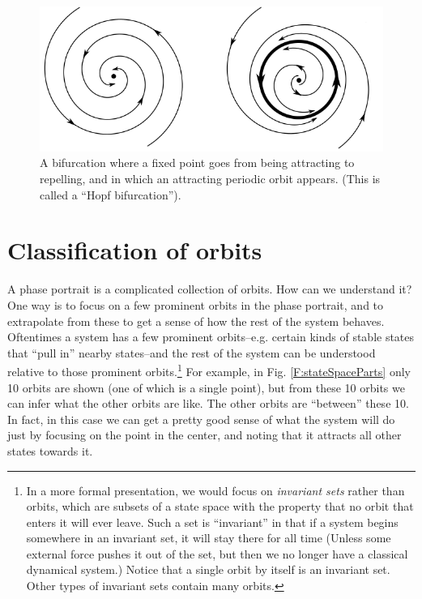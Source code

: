 \begin{figure}[h]
\centering
\includegraphics[scale=.5]{./images/bifurcation.png}
\caption[Scott Hotton.]{A bifurcation where a fixed point goes from being attracting to repelling, and in which an attracting periodic orbit appears. (This is called a ``Hopf bifurcation''). }
\label{F:bifurcation}
\end{figure}

\section{Classification of orbits}


A phase portrait is a complicated collection of orbits. How can we understand it?  One way is to focus on a few prominent orbits in the phase portrait, and to extrapolate from these to get a sense of how the rest of the system behaves. Oftentimes a system has a few prominent orbits--e.g. certain kinds of stable states that ``pull in'' nearby states--and the rest of the system can be understood relative to those prominent orbits.\footnote{In a more formal presentation, we would focus on  \emph{invariant sets} rather than orbits, which are subsets of a state space with the property that no orbit that enters it will ever leave. Such a set is ``invariant'' in that if a system begins somewhere in an invariant set, it will stay there for all time (Unless some external force pushes it out of the set, but then we no longer have a classical dynamical system.) Notice that a single orbit by itself is an invariant set. Other types of invariant sets contain many orbits.}  For example, in Fig. \ref{F:stateSpaceParts} only 10 orbits are shown (one of which is a single point), but from these 10 orbits we can infer what the other orbits are like. The other orbits are ``between'' these 10. In fact, in this case we can get a pretty good sense of what the system will do just by focusing on the point in the center, and noting that it attracts all other states towards it.

